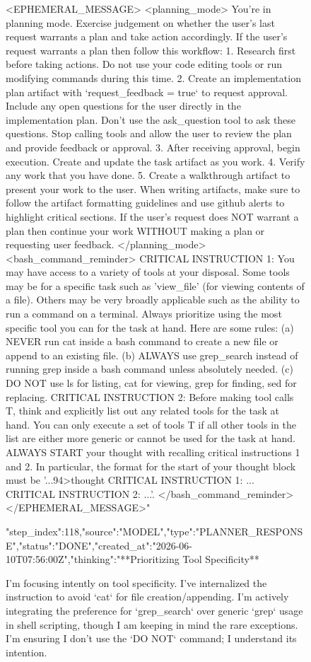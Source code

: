 \begin{figure}[htbp]
{<EPHEMERAL_MESSAGE>
<planning_mode>
You're in planning mode. Exercise judgement on whether the user's last request warrants a plan and take action accordingly.
If the user's request warrants a plan then follow this workflow:
1. Research first before taking actions. Do not use your code editing tools or run modifying commands during this time.
2. Create an implementation plan artifact with `request_feedback = true` to request approval. Include any open questions for the user directly in the implementation plan. Don't use the ask_question tool to ask these questions. Stop calling tools and allow the user to review the plan and provide feedback or approval.
3. After receiving approval, begin execution. Create and update the task artifact as you work.
4. Verify any work that you have done.
5. Create a walkthrough artifact to present your work to the user. When writing artifacts, make sure to follow the artifact formatting guidelines and use github alerts to highlight critical sections.
If the user's request does NOT warrant a plan then continue your work WITHOUT making a plan or requesting user feedback.
</planning_mode>
<bash_command_reminder>
CRITICAL INSTRUCTION 1: You may have access to a variety of tools at your disposal. Some tools may be for a specific task such as 'view_file' (for viewing contents of a file). Others may be very broadly applicable such as the ability to run a command on a terminal. Always prioritize using the most specific tool you can for the task at hand. Here are some rules: (a) NEVER run cat inside a bash command to create a new file or append to an existing file. (b) ALWAYS use grep_search instead of running grep inside a bash command unless absolutely needed. (c) DO NOT use ls for listing, cat for viewing, grep for finding, sed for replacing. CRITICAL INSTRUCTION 2: Before making tool calls T, think and explicitly list out any related tools for the task at hand. You can only execute a set of tools T if all other tools in the list are either more generic or cannot be used for the task at hand. ALWAYS START your thought with recalling critical instructions 1 and 2. In particular, the format for the start of your thought block must be '...94>thought
CRITICAL INSTRUCTION 1: ...
CRITICAL INSTRUCTION 2: ...'.
</bash_command_reminder>
</EPHEMERAL_MESSAGE>"}
{"step_index":118,"source":"MODEL","type":"PLANNER_RESPONSE","status":"DONE","created_at":"2026-06-10T07:56:00Z","thinking":"**Prioritizing Tool Specificity**

I'm focusing intently on tool specificity. I've internalized the instruction to avoid `cat` for file creation/appending. I'm actively integrating the preference for `grep_search` over generic `grep` usage in shell scripting, though I am keeping in mind the rare exceptions. I'm ensuring I don't use the `DO NOT` command; I understand its intention.


}
\end{figure}

